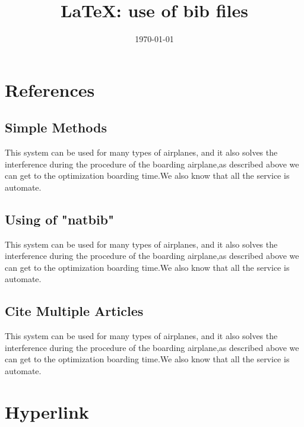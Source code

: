 \documentclass{book}
\title{\LaTeX: use of bib files}
\date{\today}
\begin{document}


\maketitle

\newpage

\section{References}
\subsection{Simple Methods}
This  system can be used for many types of airplanes\cite{dorigo2008ant}, and it also solves the interference during  the procedure of the boarding airplane,as described above we can get to the  optimization boarding time.We also know that all the service is automate.\cite[page 22]{Mitchell1997Machine}

\subsection{Using of "natbib"}
This  system can be used for many types of airplanes\citet{Xi2018RED}, and it also solves the interference during  the procedure of the boarding airplane,as described above we can get to the  optimization boarding time.We also know that all the service is automate.

\subsection{Cite Multiple Articles }

This  system can be used for many types of airplanes\cite{akyildiz2012monaco,Chernozhukov2018Double,Folkes2018An,Xi2018RED}, and it also solves the interference during  the procedure of the boarding airplane,as described above we can get to the  optimization boarding time.We also know that all the service is automate.\cite{李耀华飞机排班航班串编制模型及算法研究}


\section{Hyperlink}
\end{document}
